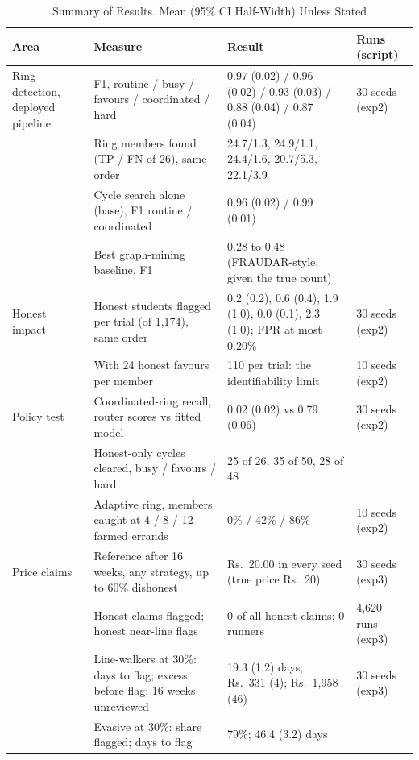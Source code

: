 \begin{table}[!t]
\caption{Summary of Results. Mean (95\% CI Half-Width) Unless Stated}
\label{tab:summary}
\centering
\scriptsize
\setlength{\tabcolsep}{3pt}
\begin{tabular}{@{}>{\raggedright}p{}>{\raggedright}p{}>{\raggedright}p{}l@{}}
\toprule
Area & Measure & Result & Runs (script) \\
\midrule
Ring detection, deployed pipeline & F1, routine / busy / favours / coordinated / hard &
0.97 (0.02) / 0.96 (0.02) / 0.93 (0.03) / 0.88 (0.04) / 0.87 (0.04) & 30 seeds (exp2) \\
& Ring members found (TP / FN of 26), same order & 24.7/1.3, 24.9/1.1, 24.4/1.6, 20.7/5.3,
22.1/3.9 & \\
& Cycle search alone (base), F1 routine / coordinated & 0.96 (0.02) / 0.99 (0.01) & \\
& Best graph-mining baseline, F1 & 0.28 to 0.48 (FRAUDAR-style, given the true count) & \\
\midrule
Honest impact & Honest students flagged per trial (of 1,174), same order &
0.2 (0.2), 0.6 (0.4), 1.9 (1.0), 0.0 (0.1), 2.3 (1.0); FPR at most 0.20\% & 30 seeds (exp2) \\
& With 24 honest favours per member & 110 per trial: the identifiability limit & 10 seeds (exp2) \\
\midrule
Policy test & Coordinated-ring recall, router scores vs fitted model & 0.02 (0.02) vs 0.79
(0.06) & 30 seeds (exp2) \\
& Honest-only cycles cleared, busy / favours / hard & 25 of 26, 35 of 50, 28 of 48 & \\
& Adaptive ring, members caught at 4 / 8 / 12 farmed errands & 0\% / 42\% / 86\% & 10 seeds (exp2) \\
\midrule
Price claims & Reference after 16 weeks, any strategy, up to 60\% dishonest & Rs.~20.00 in
every seed (true price Rs.~20) & 30 seeds (exp3) \\
& Honest claims flagged; honest near-line flags & 0 of all honest claims; 0 runners &
4,620 runs (exp3) \\
& Line-walkers at 30\%: days to flag; excess before flag; 16 weeks unreviewed & 19.3
(1.2) days; Rs.~331 (4); Rs.~1,958 (46) & 30 seeds (exp3) \\
& Evasive at 30\%: share flagged; days to flag & 79\%; 46.4 (3.2) days & \\

\end{tabular}
\end{table}
